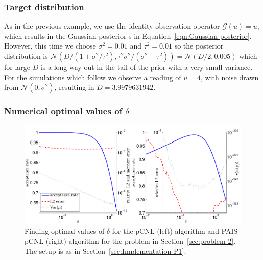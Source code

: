 \documentclass[final]{siamltex}
\newcommand{\G}{\mathcal{G}}
\newcommand{\N}{\mathcal{N}}
\begin{document}
\subsubsection{Target distribution}

As in the previous example, we use the identity observation operator $\G(u)=u$, which results in the Gaussian posterior s in Equation~\ref{eqn:Gaussian posterior}. However, this time we choose $\sigma^2=0.01$ and $\tau^2=0.01$ so the posterior distribution is $\N(D/(1+\sigma^2/\tau^2), \tau^2\sigma^2/(\sigma^2+\tau^2)) = \N(D/2, 0.005)$ which for large $D$ is a long way out in the tail of the prior with a very small variance. For the simulations which follow we observe a reading of $u=4$, with noise drawn from $\N(0, \sigma^2)$, resulting in $D = 3.9979631942$.

\subsubsection{Numerical optimal values of $\delta$}

\begin{figure}[!h]
\begin{center}
\includegraphics[width=\textwidth]{"figures/P2 opt delta"}
\caption{Finding optimal values of $\delta$ for the pCNL (left) algorithm and PAIS-pCNL (right) algorithm for the problem in Section~\ref{sec:problem 2}. The setup is as in Section~\ref{sec:Implementation P1}.}
\label{fig:P2 opt delta}
\end{center}
\end{figure}
\end{document}
